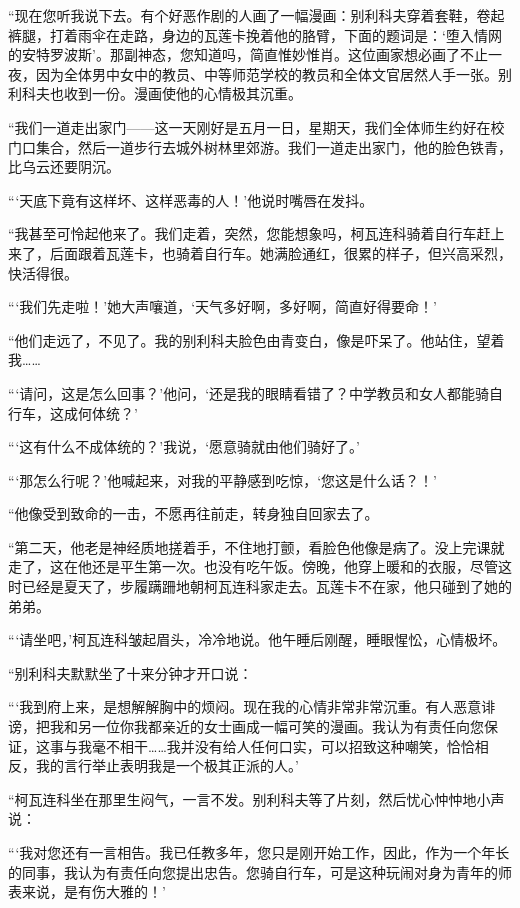 \documentclass[12pt,UTF-8,openany]{ctexbook}
\begin{document}
\begin{normalsize}
    “现在您听我说下去。有个好恶作剧的人画了一幅漫画：别利科夫穿着套鞋，卷起裤腿，打着雨伞在走路，身边的瓦莲卡挽着他的胳臂，下面的题词是：‘堕入情网的安特罗波斯’。那副神态，您知道吗，简直惟妙惟肖。这位画家想必画了不止一夜，因为全体男中女中的教员、中等师范学校的教员和全体文官居然人手一张。别利科夫也收到一份。漫画使他的心情极其沉重。
    
    “我们一道走出家门——这一天刚好是五月一日，星期天，我们全体师生约好在校门口集合，然后一道步行去城外树林里郊游。我们一道走出家门，他的脸色铁青，比乌云还要阴沉。
    
    “‘天底下竟有这样坏、这样恶毒的人！’他说时嘴唇在发抖。
    
    “我甚至可怜起他来了。我们走着，突然，您能想象吗，柯瓦连科骑着自行车赶上来了，后面跟着瓦莲卡，也骑着自行车。她满脸通红，很累的样子，但兴高采烈，快活得很。
    
    “‘我们先走啦！’她大声嚷道，‘天气多好啊，多好啊，简直好得要命！’
    
    “他们走远了，不见了。我的别利科夫脸色由青变白，像是吓呆了。他站住，望着我……
    
    “‘请问，这是怎么回事？’他问，‘还是我的眼睛看错了？中学教员和女人都能骑自行车，这成何体统？’
    
    “‘这有什么不成体统的？’我说，‘愿意骑就由他们骑好了。’
    
    “‘那怎么行呢？’他喊起来，对我的平静感到吃惊，‘您这是什么话？！’
    
    “他像受到致命的一击，不愿再往前走，转身独自回家去了。
    
    “第二天，他老是神经质地搓着手，不住地打颤，看脸色他像是病了。没上完课就走了，这在他还是平生第一次。也没有吃午饭。傍晚，他穿上暖和的衣服，尽管这时已经是夏天了，步履蹒跚地朝柯瓦连科家走去。瓦莲卡不在家，他只碰到了她的弟弟。
    
    “‘请坐吧，’柯瓦连科皱起眉头，冷冷地说。他午睡后刚醒，睡眼惺忪，心情极坏。
    
    “别利科夫默默坐了十来分钟才开口说：
    
    “‘我到府上来，是想解解胸中的烦闷。现在我的心情非常非常沉重。有人恶意诽谤，把我和另一位你我都亲近的女士画成一幅可笑的漫画。我认为有责任向您保证，这事与我毫不相干……我并没有给人任何口实，可以招致这种嘲笑，恰恰相反，我的言行举止表明我是一个极其正派的人。’
    
    “柯瓦连科坐在那里生闷气，一言不发。别利科夫等了片刻，然后忧心忡忡地小声说：
    
    “‘我对您还有一言相告。我已任教多年，您只是刚开始工作，因此，作为一个年长的同事，我认为有责任向您提出忠告。您骑自行车，可是这种玩闹对身为青年的师表来说，是有伤大雅的！’
    

\end{normalsize}
\end{document}
